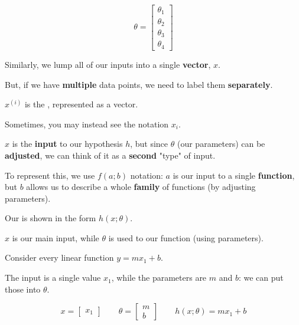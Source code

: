         \begin{equation}
            \theta =
                \begin{bmatrix}
                    \theta_1 \\ \theta_2 \\ \theta_3 \\ \theta_4
                \end{bmatrix}
        \end{equation}
        
        Similarly, we lump all of our inputs into a single \textbf{vector}, $x$. 
        
        
        But, if we have \textbf{multiple} data points, we need to label them \textbf{separately}.\\
        
        \begin{notation}
            $x^{(i)}$ is the , represented as a vector.
            
            Sometimes, you may instead see the notation $x_i$.
        \end{notation}
        
        $x$ is the \textbf{input} to our hypothesis $h$, but since $\theta$ (our parameters) can be \textbf{adjusted}, we can think of it as a \textbf{second} "type" of input.
        
        To represent this, we use $f(a;b)$ notation: $a$ is our input to a single \textbf{function}, but $b$ allows us to describe a whole \textbf{family} of functions (by adjusting parameters).\\
        
        \begin{notation}
            Our  is shown in the form $h(x;\theta)$.

            $x$ is our main input, while $\theta$ is used to  our function (using parameters).
        \end{notation}

        \miniex Consider every linear function $y=mx_1+b$.

        The input is a single value $x_1$, while the parameters are $m$ and $b$: we can put those into $\theta$.

        \begin{equation*}
            x = \begin{bmatrix}
                x_1
            \end{bmatrix}
            \qquad
            \theta = \begin{bmatrix}
                m \\ b
            \end{bmatrix}
            \qquad
            h(x;\theta) = mx_1+b
        \end{equation*}
        
